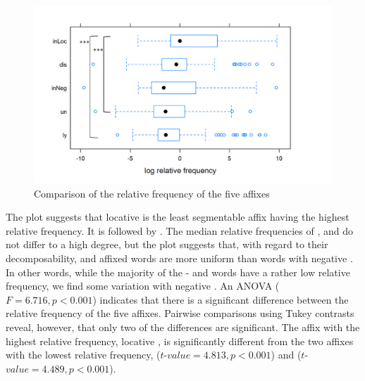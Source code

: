 \begin{figure} []
	\centering
	\includegraphics[scale=0.5]{images/Corpus/corpusComparisonRelFreq2.png}
	\caption{ Comparison of the relative frequency of the five affixes }
	\label{fig: corpus RelFreq comparison}

\end{figure}


The plot suggests that locative  is the least segmentable affix having the highest relative frequency. It is followed by . The median relative frequencies of ,  and  do not differ to a high degree, but the plot suggests that, with regard to their decomposability,  and affixed words are more uniform than words with negative . In other words, while the majority of the - and words have a rather low relative frequency, we find some variation with negative . 
 An ANOVA ($F=6.716 ,p<0.001$) indicates that there is a significant difference between the relative frequency of the five affixes. Pairwise comparisons using Tukey contrasts reveal, however, that only two of the differences are significant. The affix with the highest relative frequency, locative , is significantly different from the two affixes with the lowest relative frequency,  ($t$-$value=4.813, p<0.001$)  and  ($t$-$value=4.489, p<0.001$). 

            

